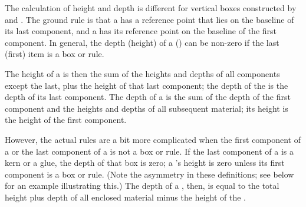 \documentclass{book}
\begin{document}
The calculation of height and depth is different
for vertical boxes constructed by  and .
The ground rule is that
a  has a reference point that lies on
the baseline of its last component,
and a  has its reference point on the baseline of the
first component.
In general, the depth (height) of a  ()
\alt
can be non-zero if the last (first) item is a box or rule.

The height of a  is then the sum of the heights and
depths of all components except the last, plus the height
of that last component; the depth of the  is the
depth of its last component.
The depth of a 
is the sum of the depth of the first component and the heights
and depths of all subsequent material; its height is the
height of the first component.

However, the actual rules are a bit
more complicated when the first component of a 
or the last component of a  is not a box or rule.
If the last component of a  is a kern or a glue,
the depth of that box is zero; a 's
height is zero
unless its first component is a box or rule.
\altt
(Note the asymmetry in these definitions; see below for
an example illustrating this.)
The depth of a , then, is equal to the total
height plus depth of all enclosed material minus
the height of the .
\end{document}
